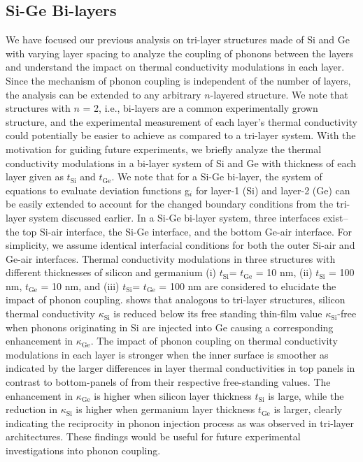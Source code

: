 \subsection{Si-Ge Bi-layers}
 We have focused our previous analysis on tri-layer structures made of Si and Ge with varying layer spacing to analyze the coupling of phonons between the layers and understand the impact on thermal conductivity modulations in each layer. Since the mechanism of phonon coupling is independent of the number of layers, the analysis can be extended to any arbitrary $n$-layered structure. We note that structures with $n$ = 2, i.e., bi-layers are a common experimentally grown structure, and the experimental measurement of each layer’s thermal conductivity \cite{RN189,RN126} could potentially be easier to achieve as compared to a tri-layer system. With the motivation for guiding future experiments, we briefly analyze the thermal conductivity modulations in a bi-layer system of Si and Ge with thickness of each layer given as $t_{\text{Si}}$ and $t_{\text{Ge}}$. We note that for a Si-Ge bi-layer, the system of equations to evaluate deviation functions \gls{g}$_i$ for layer-1 (Si) and layer-2 (Ge) can be easily extended to account for the changed boundary conditions from the tri-layer system discussed earlier. In a Si-Ge bi-layer system, three interfaces exist--the top Si-air interface, the Si-Ge interface, and the bottom Ge-air interface. For simplicity, we assume identical interfacial conditions for both the outer Si-air and Ge-air interfaces. Thermal conductivity modulations in three structures with different thicknesses of silicon and germanium (i) $t_{\text{Si}}$= $t_{\text{Ge}}$ = 10 nm, (ii) $t_{\text{Si}}$ = 100 nm, $t_{\text{Ge}}$ = 10 nm, and (iii) $t_{\text{Si}}$= $t_{\text{Ge}}$ = 100 nm are considered to elucidate the impact of phonon coupling.  shows that analogous to tri-layer structures, silicon thermal conductivity $\kappa_{\text{Si}}$ is reduced below its free standing thin-film value $\kappa_{\text{Si}}$-free when phonons originating in Si are injected into Ge causing a corresponding enhancement in $\kappa_{\text{Ge}}$. The impact of phonon coupling on thermal conductivity modulations in each layer is stronger when the inner surface is smoother as indicated by the larger differences in layer thermal conductivities in top panels in contrast to bottom-panels of  from their respective free-standing values. The enhancement in $\kappa_{\text{Ge}}$ is higher when silicon layer thickness $t_{\text{Si}}$ is large, while the reduction in $\kappa_{\text{Si}}$ is higher when germanium layer thickness $t_{\text{Ge}}$ is larger, clearly indicating the reciprocity in phonon injection process as was observed in tri-layer architectures. These findings would be useful for future experimental investigations into phonon coupling.
